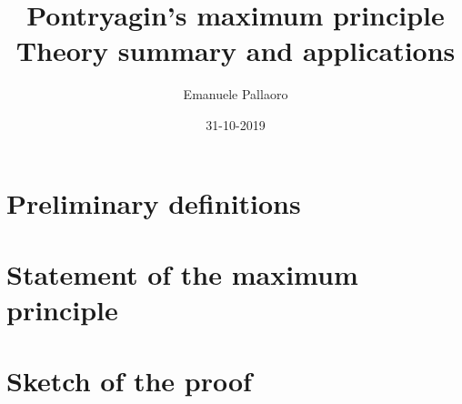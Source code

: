 \documentclass[14pt, margin=2pt]{article}
\title{%
	Pontryagin's maximum principle\\
	\large Theory summary and applications
}
\author{Emanuele Pallaoro}
\date{31-10-2019}
\numberwithin{equation}{section}
\begin{document}
\maketitle
\pagestyle{plain}

\newtheorem{teo}{Theorem}[subsection]
\newtheorem*{cor}{Corollary}


\section{Preliminary definitions}

\section{Statement of the maximum principle}

\section{Sketch of the proof}


\end{document}
